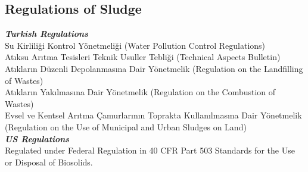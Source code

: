 \documentclass[a4paper, landscape, 8pt]{extarticle}
\begin{document}
\begin{multicols}{4}
\section*{Regulations of Sludge}
\textbf{\textit{Turkish Regulations}}\\
Su Kirliliği Kontrol Yönetmeliği (Water Pollution Control Regulations)\\
Atıksu Arıtma Tesisleri Teknik Usuller Tebliği (Technical Aspects Bulletin)\\
Atıkların Düzenli Depolanmasına Dair Yönetmelik (Regulation on the Landfilling of Wastes)\\
Atıkların Yakılmasına Dair Yönetmelik (Regulation on the Combustion of Wastes)\\
Evsel ve Kentsel Arıtma Çamurlarının Toprakta Kullanılmasına Dair Yönetmelik (Regulation on the Use of Municipal and Urban Sludges on Land)\\
\textbf{\textit{US Regulations}}\\
Regulated under Federal Regulation in 40 CFR Part 503 Standards for the Use or Disposal of Biosolids.
\end{multicols}
\printbibliography
\end{document}
